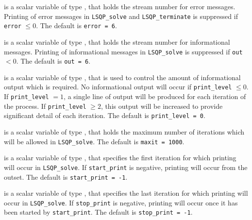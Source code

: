 \documentclass{galahad}
\newcommand{\packagename}{LSQP}
\begin{document}
\begin{description}

 is a scalar variable of type \integer, that holds the
stream number for error messages. Printing of error messages in 
{\tt \packagename\_solve} and {\tt \packagename\_terminate} is suppressed if 
{\tt error} $\leq 0$.
The default is {\tt error = 6}.

 is a scalar variable of type \integer, that holds the
stream number for informational messages. Printing of informational messages in 
{\tt \packagename\_solve} is suppressed if {\tt out} $< 0$.
The default is {\tt out = 6}.

 is a scalar variable of type \integer, that is used
to control the amount of informational output which is required. No 
informational output will occur if {\tt print\_level} $\leq 0$. If 
{\tt print\_level} $= 1$, a single line of output will be produced for each
iteration of the process. If {\tt print\_level} $\geq 2$, this output will be
increased to provide significant detail of each iteration.
The default is {\tt print\_level = 0}.

 is a scalar variable of type \integer, that holds the
maximum number of iterations which will be allowed in {\tt \packagename\_solve}.
The default is {\tt maxit = 1000}.

 is a scalar variable of type \integer, that specifies
the first iteration for which printing will occur in {\tt \packagename\_solve}.
If {\tt start\_print} is negative, printing will occur from the outset.
The default is {\tt start\_print = -1}.

 is a scalar variable of type \integer, that specifies
the last iteration for which printing will occur in  {\tt \packagename\_solve}.
If {\tt stop\_print} is negative, printing will occur once it has been 
started by {\tt start\_print}.
The default is {\tt stop\_print = -1}.




\end{description}
\end{document}
